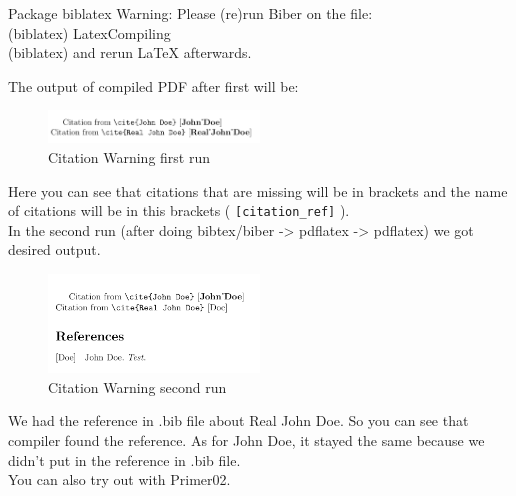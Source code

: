 \documentclass[a4paper,oneside,8pt]{extarticle}
\begin{document}
\begin{enumerate}
\begin{itemize}
\begin{markdown-block}
                Package biblatex Warning: Please (re)run Biber on the file:\\
                (biblatex)                LatexCompiling\\
                (biblatex)                and rerun LaTeX afterwards.\\
            \end{markdown-block}
            The output of compiled PDF after first will be:\\
            \begin{figure}[H]
                \centering
                \includegraphics[width=0.5\textwidth]{CitationWarning01.png}
                \caption{Citation Warning first run}
                \label{fig:CitationWarning01}
            \end{figure}
            Here you can see that citations that are missing will be in brackets and the name of citations will be in this brackets ( \verb|[citation_ref]| ).\\
            In the second run (after doing bibtex/biber -> pdflatex -> pdflatex) we got desired output.\\
            \begin{figure}[H]
                \centering
                \includegraphics[width=0.5\textwidth]{CitationWarning02.png}
                \caption{Citation Warning second run}
                \label{fig:CitationWarning02}
            \end{figure}
            We had the reference in .bib file about Real John Doe. So you can see that compiler found the reference. As for John Doe, it stayed the same because we didn't put in the reference in .bib file. \\

            You can also try out with Primer02. 

        \end{itemize}



\end{enumerate}
\end{document}
